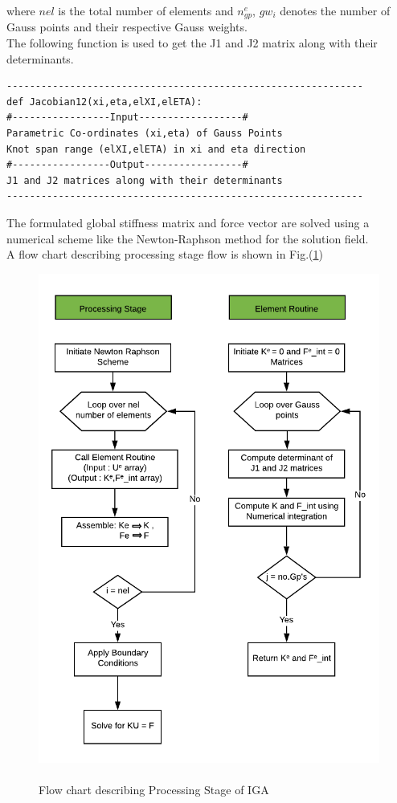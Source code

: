 \documentclass[11pt]{article}
\begin{document}
\noindent
where $nel$ is the total number of elements and $n_{gp}^e$, $gw_i$ denotes the
number of Gauss points and their respective Gauss weights.\\
\noindent
The following function is used to get the J1 and J2 matrix along with their determinants.
\begin{verbatim}
--------------------------------------------------------------
def Jacobian12(xi,eta,elXI,elETA):
#-----------------Input------------------#
Parametric Co-ordinates (xi,eta) of Gauss Points
Knot span range (elXI,elETA) in xi and eta direction
#-----------------Output-----------------#
J1 and J2 matrices along with their determinants
--------------------------------------------------------------
\end{verbatim}
The formulated global stiffness matrix and force vector are solved using a numerical scheme like the Newton-Raphson method for the solution field.
\\A flow chart describing processing stage flow is shown in Fig.(\ref{Processing})
\begin{figure}[H]
	\begin{center}
		\includegraphics[scale=1.0]{Processing.png} 
		\caption{\\Flow chart describing Processing Stage of IGA}\label{Processing}
	\end{center}
\end{figure}
\end{document}

